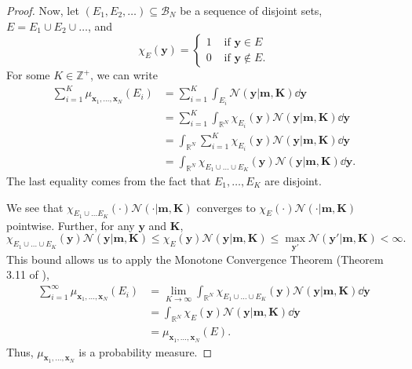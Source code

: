 \begin{proof}
    Now, let $(E_1, E_2, \dots) \subseteq \mathcal{B}_{N}$ be a sequence of disjoint sets, $E = E_1 \cup E_2 \cup \dots$, and
    \begin{equation*}
        \chi_{E}(\mathbf{y}) =
        \begin{cases}
            1 & \text{ if $\mathbf{y} \in E$} \\
            0 & \text{ if $\mathbf{y} \notin E$}.
        \end{cases}
    \end{equation*}
    For some $K \in \mathbb{Z}^{+}$, we can write
    \begin{align*}
        \sum_{i = 1}^{K} \mu_{\mathbf{x}_1, \dots, \mathbf{x}_N}(E_i)
        & = \sum_{i = 1}^{K} \int_{E_i} \mathcal{N}(\mathbf{y} | \mathbf{m}, \mathbf{K}) \dd \mathbf{y} \\
        & = \sum_{i = 1}^{K} \int_{\mathbb{R}^{N}} \chi_{E_i}(\mathbf{y})\mathcal{N}(\mathbf{y} | \mathbf{m}, \mathbf{K}) \dd \mathbf{y} \\
        & =  \int_{\mathbb{R}^{N}} \sum_{i = 1}^{K}\chi_{E_i}(\mathbf{y})\mathcal{N}(\mathbf{y} | \mathbf{m}, \mathbf{K}) \dd \mathbf{y} \\
        & =  \int_{\mathbb{R}^{N}} \chi_{E_1 \cup \dots \cup E_K}(\mathbf{y})\mathcal{N}(\mathbf{y} | \mathbf{m}, \mathbf{K}) \dd \mathbf{y}.
    \end{align*}
    The last equality comes from the fact that $E_1, \dots, E_K$ are disjoint.

    We see that $\chi_{E_1 \cup \dots E_K}(\cdot)\mathcal{N}(\cdot | \mathbf{m}, \mathbf{K})$ converges to $\chi_E(\cdot) \mathcal{N}(\cdot | \mathbf{m}, \mathbf{K})$ pointwise.
    Further, for any $\mathbf{y}$ and $\mathbf{K}$,
    \begin{equation*}
        \chi_{E_1 \cup \dots \cup E_K}(\mathbf{y}) \mathcal{N}(\mathbf{y} | \mathbf{m}, \mathbf{K})
        \leq
        \chi_E(\mathbf{y}) \mathcal{N}(\mathbf{y} | \mathbf{m}, \mathbf{K})
        \leq \max_{\mathbf{y}'}\mathcal{N}(\mathbf{y'} | \mathbf{m}, \mathbf{K})
        < \infty.
    \end{equation*}
    This bound allows us to apply the Monotone Convergence Theorem (Theorem 3.11 of \cite{axler2020}),
    \begin{align*}
        \sum_{i = 1}^{\infty} \mu_{\mathbf{x}_1, \dots, \mathbf{x}_N}(E_i)
        & = \lim_{K \to \infty}\int_{\mathbb{R}^{N}} \chi_{E_1 \cup \dots \cup E_K}(\mathbf{y})\mathcal{N}(\mathbf{y} | \mathbf{m}, \mathbf{K}) \dd \mathbf{y} \\
        & = \int_{\mathbb{R}^{N}} \chi_{E}(\mathbf{y})\mathcal{N}(\mathbf{y} | \mathbf{m}, \mathbf{K}) \dd \mathbf{y} \\
        & = \mu_{\mathbf{x}_1, \dots, \mathbf{x}_N}(E).
    \end{align*}
    Thus, $\mu_{\mathbf{x}_1, \dots, \mathbf{x}_N}$ is a probability measure.


\end{proof}
